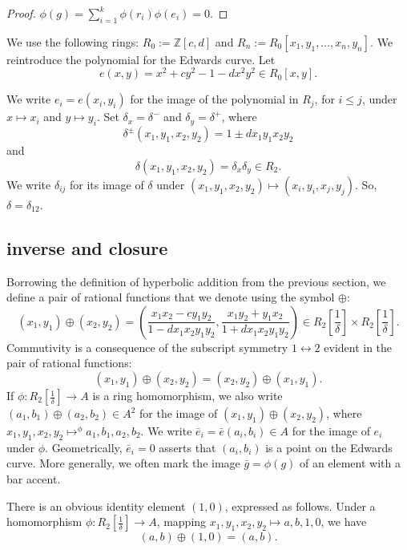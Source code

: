 \documentclass[12pt]{article}
\newcommand{\ring}[1]{\mathbb{#1}}
\newcommand{\f}[1]{\frac{1}{#1}}
\begin{document}
\begin{proof}
$\phi(g) = \sum_{i=1}^k \phi(r_i) \phi(e_i) = 0.$
\end{proof}

We use the following rings: $R_0 := \ring{Z}[c,d]$ and $R_n :=
R_0[x_1,y_1,\ldots,x_n,y_n]$.  We reintroduce the polynomial for the
Edwards curve.  Let
\begin{equation}
e(x,y) = x^2 + c y^2 -1 - d x^2 y^2 \in  R_0[x,y].
\end{equation}



We write $e_i = e(x_i,y_i)$ for the image of the polynomial in $R_j$,
for $i\le j$, under $x\mapsto x_i$ and $y\mapsto y_i$.  Set
$\delta_x = \delta^-$ and $\delta_y = \delta^+$, where
\[\delta^{\pm} (x_1,y_1,x_2,y_2) = 1\pm d x_1 y_1 x_2 y_2\] and
\[
\delta(x_1,y_1,x_2,y_2) = \delta_x\delta_y\in R_2.
\]
We write $\delta_{ij}$ for its image of $\delta$ under
$(x_1,y_1,x_2,y_2)\mapsto (x_i,y_i,x_j,y_j)$.  So,
$\delta=\delta_{12}$.

\subsection{inverse and closure}

Borrowing the definition of hyperbolic addition from the previous
section, we define a pair of rational functions that we denote using
the symbol $\oplus$:
\begin{equation}\label{eqn:add}
(x_1,y_1) \oplus (x_2,y_2) =  \left(\frac{x_1 x_2 - c y_1 y_2}{1 - d x_1 x_2 y_1 y_2},
\frac{x_1 y_2 + y_1 x_2}{1+d x_1 x_2 y_1 y_2}\right) \in R_2[\f{\delta}]\times R_2[\f{\delta}].
\end{equation}
Commutivity is a consequence of the subscript symmetry
$1\leftrightarrow 2$ evident in the pair of rational functions:
\[
(x_1,y_1) \oplus (x_2,y_2) = (x_2,y_2) \oplus (x_1,y_1).
\]
If $\phi:R_2[\f{\delta}]\to A$ is a ring homomorphism, we also write
$(a_1,b_1)\oplus (a_2,b_2)\in A^2$ for the image of $(x_1,y_1)\oplus
(x_2,y_2)$, where $x_1,y_1,x_2,y_2 \mapsto^\phi a_1,b_1,a_2,b_2$.  We
write $\bar e_i=\bar e(a_i,b_i)\in A$ for the image of $e_i$ under
$\phi$.  Geometrically, $\bar e_i=0$ asserts that $(a_i,b_i)$ is a
point on the Edwards curve.  More generally, we often mark the image
$\bar g=\phi(g)$ of an element with a bar accent.

There is an obvious identity element $(1,0)$, expressed as follows.
Under a homomorphism $\phi:R_2[\f{\delta}]\to A$, mapping
$x_1,y_1,x_2,y_2\mapsto a,b,1,0$, we have 
\begin{equation}
(a,b)\oplus(1,0) = (a,b).
\end{equation}
\end{document}
